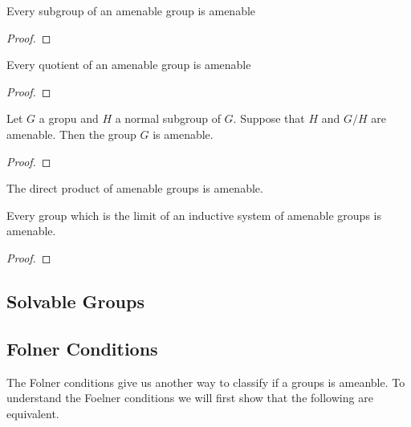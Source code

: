 \begin{propn}
  Every subgroup of an amenable group is amenable
\end{propn}
\begin{proof}
  
\end{proof}

\begin{propn}
  Every quotient of an amenable group is amenable
\end{propn}
\begin{proof}
  
\end{proof}

\begin{propn}
  Let $G$ a gropu and $H$ a normal subgroup of $G$. Suppose that $H$ and
  $G / H$ are amenable. Then the group $G$ is amenable.
\end{propn}
\begin{proof}
  
\end{proof}

\begin{cor}
  The direct product of amenable groups is amenable.
\end{cor}

\begin{propn}
  Every group which is the limit of an inductive system of amenable groups is
  amenable.
\end{propn}
\begin{proof}
  
\end{proof}

\subsection{Solvable Groups}%
\label{sub:Solvable Groups}

\subsection{Folner Conditions}%
\label{sub:Folner Conditions}
The Folner conditions give us another way to classify if a groups is ameanble.
To understand the Foelner conditions we will first show that the following are
equivalent.

